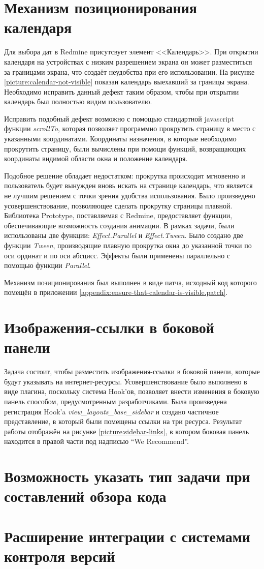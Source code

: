 \section{Механизм позиционирования календаря}
Для выбора дат в Redmine присутсвует элемент <<Календарь>>. При открытии
календаря на устройствах с низким разрешением экрана он может разместиться за
границами экрана, что создаёт неудобства при его использовании. На рисунке
\ref{picture:calendar-not-visible} показан календарь выехавший за границы
экрана. Необходимо исправить данный дефект таким образом, чтобы при открытии
календарь был полностью видим пользователю.

Исправить подобный дефект возможно с помощью стандартной javascript
функции \textit{scrollTo}, которая позволяет программно прокрутить
страницу в место с указанными координатами. Координаты назначения, в которые
необходимо прокрутить страницу, были вычислены при помощи функций,
возвращающих координаты видимой области окна и положение календаря.

Подобное решение обладает недостатком: прокрутка происходит мгновенно и
пользователь будет вынужден вновь искать на странице календарь, что является не
лучшим решением с точки зрения удобства использования. Было произведено
усовершенствование, позволяющее сделать прокрутку страницы плавной.
Библиотека Prototype, поставляемая с Redmine, предоставляет функции,
обеспечивающие возможность создания анимации. В рамках задачи, были
использованы две функции: \textit{Effect.Parallel} и \textit{Effect.Tween}.
Было создано две функции \textit{Tween}, производящие плавную прокрутка окна до
указанной точки по оси ординат и по оси абсцисс. Эффекты были применены
параллельно с помощью функции \textit{Parallel}.

Механизм позиционирования был выполнен в виде патча, исходный код
которого помещён в приложении
\ref{appendix:ensure-that-calendar-is-visible.patch}.

\section{Изображения-ссылки в боковой панели}
Задача состоит, чтобы разместить изображения-ссылки в боковой панели, которые
будут указывать на интернет-ресурсы. Усовершенствование было выполнено в виде плагина, поскольку система Hook'ов,
позволяет внести изменения в боковую панель способом, предусмотренным
разработчиками. Была произведена регистрация Hook'a
\textit{view\_layouts\_base\_sidebar} и создано частичное представление, в
который были помещены ссылки на три ресурса. Результат работы отображён на
рисунке \ref{picture:sidebar-links}, в котором боковая панель находится в
правой части под надписью ``We Recommend''.



\section{Возможность указать тип задачи при составлений обзора кода}

\section{Расширение интеграции с системами контроля версий}



